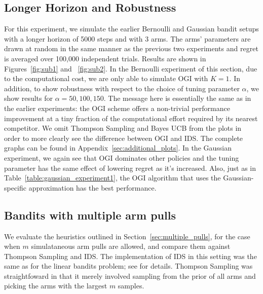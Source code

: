 \subsection{Longer Horizon and Robustness} \label{exp:robustness}

For this experiment, we simulate the earlier Bernoulli and Gaussian bandit setups with a longer horizon of 5000 steps and with 3 arms. The arms' parameters are drawn  at random in the same manner as the previous two experiments and regret is averaged over 100,000 independent trials. Results are shown in Figures~\ref{fig:sub1} and ~\ref{fig:sub2}. In the Bernoulli experiment of this section, due to the computational cost, we are only able to simulate OGI with $K = 1$. In addition, to show robustness with respect to the choice of tuning parameter $\alpha$, we show results for $\alpha = 50,100,150$. The message here is essentially the same as in the earlier experiments: the OGI scheme offers a non-trivial performance improvement at a tiny fraction of the computational effort required by its nearest competitor. We omit Thompson Sampling and Bayes UCB from the plots in order to more clearly see the difference between OGI and IDS. The complete graphs can be found in Appendix~\ref{sec:additional_plots}.
In the Gaussian experiment, we again see that OGI dominates other policies and the tuning parameter has the same effect of lowering regret as it's increased. Also, just as in Table~\ref{table:gaussian_experiment1}, the OGI algorithm that uses the Gaussian-specific approximation has the best performance. 

\subsection{Bandits with multiple arm pulls}
We evaluate the heuristics outlined in Section~\ref{sec:multiple_pulls}, for the case when $m$ simulataneous arm pulls are allowed, and compare them against Thompson Sampling and IDS. The implementation of IDS in this setting was the same as for the linear bandits problem; see \citep{russo2014learning} for details. Thompson Sampling was straightfoward in that it merely involved sampling from the prior of all arms and picking the arms with the largest $m$ samples. 

